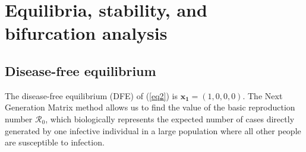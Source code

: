 \documentclass[11pt,reqno]{amsart}
\theoremstyle{boldremark}
\begin{document}
\section{Equilibria, stability, and bifurcation analysis} \label{section2}

\subsection{Disease-free equilibrium}

\noindent The disease-free equilibrium (DFE) of (\ref{eq2}) is $\mathbf{x_1}=(1,0,0,0)$. The Next Generation Matrix method \cite{1} allows us to find the value of the basic reproduction number $\mathcal{R}_0$, which biologically represents the expected number of cases directly generated by one infective individual in a large population where all other people are susceptible to infection.
\end{document}
